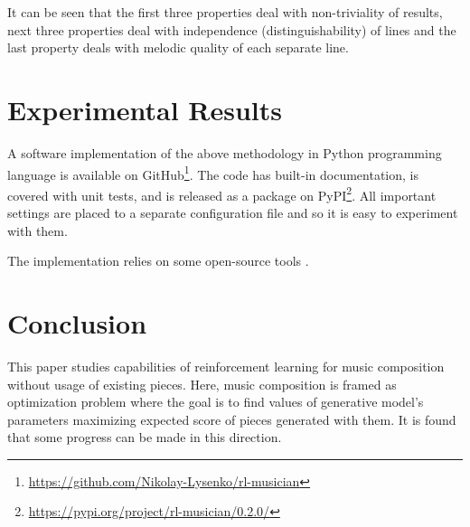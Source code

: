 \documentclass{article}
\begin{document}
It can be seen that the first three properties deal with non-triviality of results, next three properties deal with independence (distinguishability) of lines and the last property deals with melodic quality of each separate line. 


\section{Experimental Results}
\label{sec:results}

A software implementation of the above methodology in Python programming language is available on GitHub\footnote{\url{https://github.com/Nikolay-Lysenko/rl-musician}}. The code has built-in documentation, is covered with unit tests, and is released as a package on PyPI\footnote{\url{https://pypi.org/project/rl-musician/0.2.0/}}. All important settings are placed to a separate configuration file and so it is easy to experiment with them.

The implementation relies on some open-source tools \cite{brockman2016openai,chollet2015keras,oliphant2006guide,raffel2014intuitive}.





\section{Conclusion}
\label{sec:conclusion}

This paper studies capabilities of reinforcement learning for music composition without usage of existing pieces. Here, music composition is framed as optimization problem where the goal is to find values of generative model's parameters maximizing expected score of pieces generated with them. It is found that some progress can be made in this direction.
\end{document}
